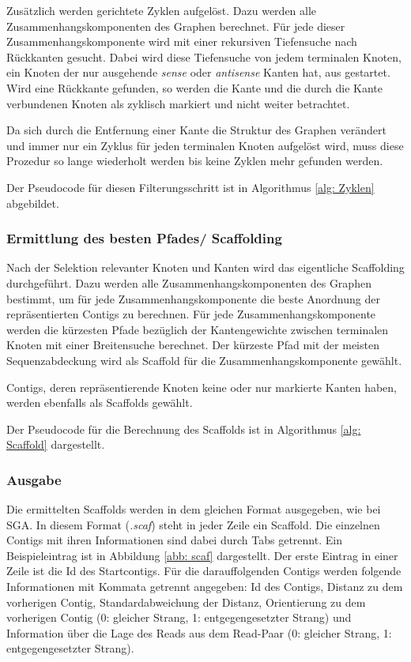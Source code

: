 \documentclass[a4paper,11pt,parskip]{scrartcl}
\begin{document}
Zusätzlich werden gerichtete Zyklen aufgelöst. Dazu werden alle
Zusammenhangskomponenten des Graphen berechnet. Für jede dieser
Zusammenhangskomponente wird mit einer rekursiven Tiefensuche nach
Rückkanten gesucht. Dabei wird diese Tiefensuche von jedem terminalen
Knoten, ein Knoten der nur ausgehende \textit{sense} oder
\textit{antisense} Kanten hat, aus gestartet. Wird eine Rückkante
gefunden, so werden die Kante und die durch die Kante verbundenen
Knoten als zyklisch markiert und nicht weiter betrachtet.

Da sich durch die Entfernung einer Kante die Struktur des Graphen
verändert und immer nur ein Zyklus für jeden terminalen Knoten
aufgelöst wird, muss diese Prozedur so lange wiederholt werden bis
keine Zyklen mehr gefunden werden.

Der Pseudocode für diesen Filterungsschritt ist in Algorithmus
\ref{alg: Zyklen} abgebildet.

\subsubsection{Ermittlung des besten Pfades/ Scaffolding}

Nach der Selektion relevanter Knoten und Kanten wird das eigentliche
Scaffolding durchgeführt. Dazu werden alle Zusammenhangskomponenten
des Graphen bestimmt, um für jede Zusammenhangskomponente die beste
Anordnung der repräsentierten Contigs zu berechnen. Für jede
Zusammenhangskomponente werden die kürzesten Pfade bezüglich der
Kantengewichte zwischen terminalen Knoten mit einer Breitensuche
berechnet. Der kürzeste Pfad mit der meisten Sequenzabdeckung wird als
Scaffold für die Zusammenhangskomponente gewählt.

Contigs, deren repräsentierende Knoten keine oder nur markierte Kanten
haben, werden ebenfalls als Scaffolds gewählt.

Der Pseudocode für die Berechnung des Scaffolds ist in Algorithmus
\ref{alg: Scaffold} dargestellt.

\subsubsection{Ausgabe}
Die ermittelten Scaffolds werden in dem gleichen Format ausgegeben,
wie bei SGA. In diesem Format (\textit{.scaf}) steht in jeder Zeile
ein Scaffold. Die einzelnen Contigs mit ihren Informationen sind dabei
durch Tabs getrennt. Ein Beispieleintrag ist in Abbildung \ref{abb:
  scaf} dargestellt. Der erste Eintrag in einer Zeile ist die Id des
Startcontigs. Für die darauffolgenden Contigs werden folgende
Informationen mit Kommata getrennt angegeben: Id des Contigs, Distanz
zu dem vorherigen Contig, Standardabweichung der Distanz, Orientierung
zu dem vorherigen Contig (0: gleicher Strang, 1: entgegengesetzter
Strang) und Information über die Lage des Reads aus dem Read-Paar (0:
gleicher Strang, 1: entgegengesetzter Strang).
\end{document}
